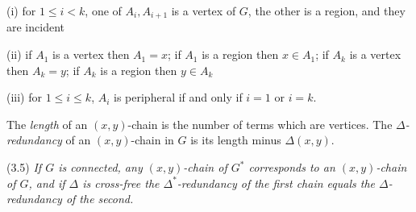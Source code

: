 \hspace*{12pt}(i) for $1 \le i < k$, one of $A_i, A_{i+1}$ is a vertex of $G$, the other is a region, and they are incident

\hspace*{12pt}(ii) if $A_1$ is a vertex then $A_1 = x$; if $A_1$ is a region then $x \in A_1$; if $A_k$ is a vertex then $A_k = y$; if $A_k$ is a region then $y \in A_k$

\hspace*{12pt}(iii) for $1 \le i \le k$, $A_i$ is peripheral if and only if $i = 1$ or $i = k$.

The \textit{length} of an $(x, y)$-chain is the number of terms which are vertices. The \textit{$\Delta$-redundancy} of an $(x, y)$-chain in $G$ is its length minus $\Delta(x, y)$.

\stmt
(3.5) \textit{If $G$ is connected, any $(x, y)$-chain of $G^*$ corresponds to an $(x, y)$-chain of $G$, and if $\Delta$ is cross-free the $\Delta^*$-redundancy of the first chain equals the $\Delta$-redundancy of the second.}
